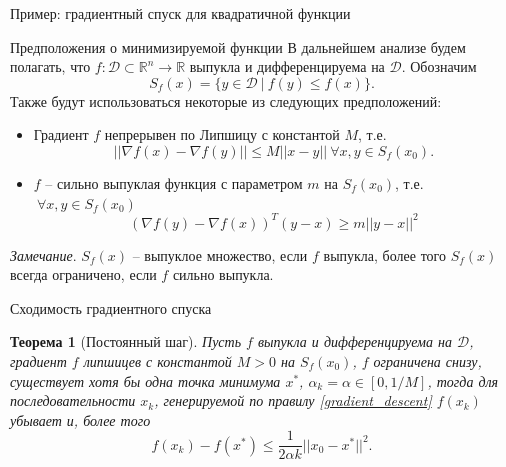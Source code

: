 \documentclass[10pt]{beamer}
\newtheorem{theorem_ru}{Теорема}[]
\begin{document}
\begin{frame}{Пример: градиентный спуск для квадратичной функции}
%
%
\end{frame}

\begin{frame}{Предположения о минимизируемой функции}
В дальнейшем анализе будем полагать, что $f:\mathcal{D}\subset\mathbb{R}^n\rightarrow \mathbb{R}$ выпукла и дифференцируема на $\mathcal{D}$. Обозначим  
$$
S_f(x)=\{y\in\mathcal{D}~|~f(y)\leq f(x)\}.
$$ 
Также будут использоваться некоторые из следующих предположений:
\pause
\begin{itemize}[<+->]
\item Градиент $f$ непрерывен по Липшицу с константой $M$, т.е. 
$$||\nabla f(x)-\nabla f(y)||\leq M||x-y||~\forall x,y\in S_f(x_0).$$
\item $f$ -- сильно выпуклая функция с параметром $m$ на $S_f(x_0)$, т.е. $~\forall x,y\in S_f(x_0)$ 
$$
(\nabla f(y)-\nabla f(x))^T(y-x)\geq m||y-x||^2
$$
\end{itemize}
\pause
\textit{Замечание}. $S_f(x)$ -- выпуклое множество, если $f$ выпукла, более того $S_f(x)$ всегда ограничено, если $f$ сильно выпукла.
\end{frame}

\begin{frame}{Сходимость градиентного спуска}
\begin{theorem_ru}[Постоянный шаг]
Пусть $f$ выпукла и дифференцируема на $\mathcal{D}$, градиент $f$ липшицев с константой $M>0$ на $S_f(x_0)$, $f$ ограничена снизу,
существует хотя бы одна точка минимума $x^*$, $\alpha_k=\alpha\in [0, 1/M]$,
тогда для последовательности $x_k$, генерируемой по правилу \eqref{gradient_descent}  $f(x_k)$ убывает и, более того
$$
f(x_k)-f(x^*)\leq \frac{1}{2\alpha k}||x_0-x^*||^2.
$$
\end{theorem_ru}
\end{frame}
\end{document}
